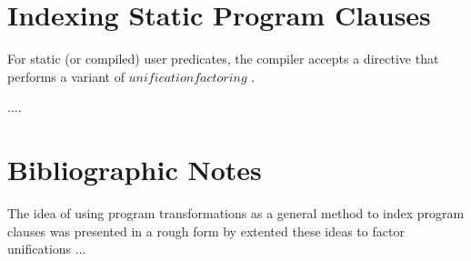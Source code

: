 \section{Indexing Static Program Clauses}\label{impl-index}

For static (or compiled) user predicates, the compiler accepts a
directive that performs a variant of $unification factoring$ 
\cite{DRRSSSW94}.  

....

\section*{Bibliographic Notes}

The idea of using program transformations as a general method to index
program clauses was presented in a rough form by \cite{HM89}
\cite{DRRSSSW94}  extented these ideas to factor unifications ...
